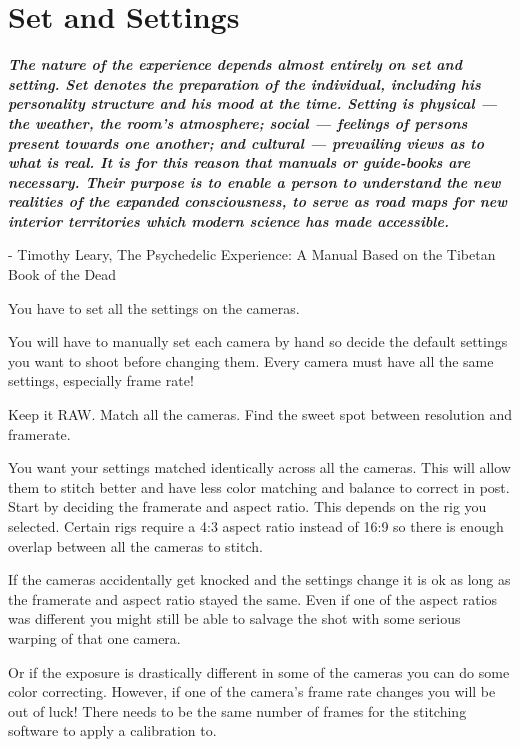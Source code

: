 \chapter{Set and Settings}
\pagecolor{white}
\label{chap:6}
\begin{fullwidth}


{\itshape\bfseries The nature of the experience depends almost entirely on set and setting. Set denotes the preparation of the individual, including his personality structure and his mood at the time. Setting is physical — the weather, the room’s atmosphere; social — feelings of persons present towards one another; and cultural — prevailing views as to what is real. It is for this reason that manuals or guide-books are necessary. Their purpose is to enable a person to understand the new realities of the expanded consciousness, to serve as road maps for new interior territories which modern science has made accessible.}

- Timothy Leary, The Psychedelic Experience: A Manual Based on the Tibetan Book of the Dead
\vspace{\baselineskip}

\problem

{\large You have to set all the settings on the cameras. \par}

You will have to manually set each camera by hand so decide the default settings you want to shoot before changing them. Every camera must have all the same settings, especially frame rate!

\solution

{\large Keep it RAW. Match all the cameras. Find the sweet spot between resolution and framerate. \par}

You want your settings matched identically across all the cameras. This will allow them to stitch better and have less color matching and balance to correct in post. Start by deciding the framerate and aspect ratio. This depends on the rig you selected. Certain rigs require a 4:3 aspect ratio instead of 16:9 so there is enough overlap between all the cameras to stitch. 

If the cameras accidentally get knocked and the settings change it is ok as long as the framerate and aspect ratio stayed the same. Even if one of the aspect ratios was different you might still be able to salvage the shot with some serious warping of that one camera. 

Or if the exposure is drastically different in some of the cameras you can do some color correcting. However, if one of the camera’s frame rate changes you will be out of luck! There needs to be the same number of frames for the stitching software to apply a calibration to. 


\end{fullwidth}
